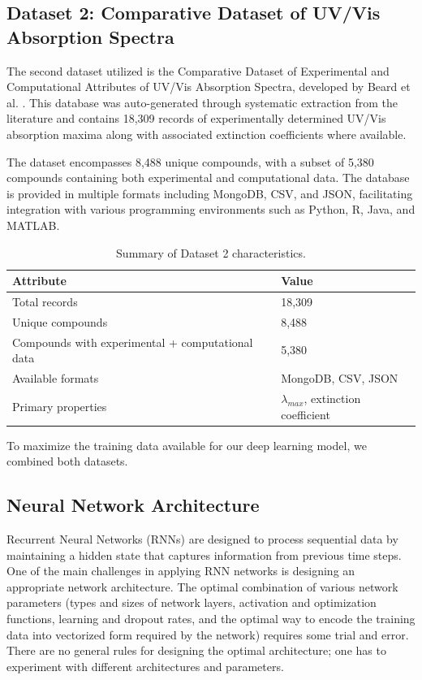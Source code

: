 \documentclass[11pt,a4paper]{article}
\begin{document}
\subsection{Dataset 2: Comparative Dataset of UV/Vis Absorption Spectra}

The second dataset utilized is the Comparative Dataset of Experimental and Computational Attributes of UV/Vis Absorption Spectra, developed by Beard et al. \cite{beardComparativeDatasetExperimental2019}. This database was auto-generated through systematic extraction from the literature and contains 18,309 records of experimentally determined UV/Vis absorption maxima along with associated extinction coefficients where available.

The dataset encompasses 8,488 unique compounds, with a subset of 5,380 compounds containing both experimental and computational data. The database is provided in multiple formats including MongoDB, CSV, and JSON, facilitating integration with various programming environments such as Python, R, Java, and MATLAB.
\begin{table}[H]
\centering
\caption{Summary of Dataset 2 characteristics.}
\label{tab:dataset2_summary}
\begin{tabular}{ll}
\toprule
\textbf{Attribute} & \textbf{Value} \\
\midrule
Total records & 18,309 \\
Unique compounds & 8,488 \\
Compounds with experimental + computational data & 5,380 \\
Available formats & MongoDB, CSV, JSON \\
Primary properties & $\lambda_{max}$, extinction coefficient \\
\bottomrule
\end{tabular}
\end{table}

To maximize the training data available for our deep learning model, we combined both datasets.

\subsection{Neural Network Architecture}

Recurrent Neural Networks (RNNs) are designed to process sequential data by maintaining a hidden state that captures information from previous time steps. One of the main challenges in applying RNN networks is designing an appropriate network architecture. The optimal combination of various network parameters (types and sizes of network layers, activation and optimization functions, learning and dropout rates, and the optimal way to encode the training data into vectorized form required by the network) requires some trial and error. There are no general rules for designing the optimal architecture; one has to experiment with different architectures and parameters.
\end{document}
